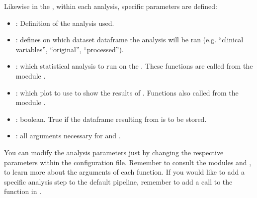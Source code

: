 \documentclass[letterpaper,10pt,english]{sphinxmanual}
\begin{document}
Likewise in the {\hyperref[\detokenize{getting_started/data_settings/clinical-data:clinical-data-conf-file}]{}}, within each analysis, specific parameters are defined:
\begin{itemize}
\item {} 
: Definition of the analysis used.

\item {} 
: defines on which dataset dataframe the analysis will be ran (e.g. “clinical variables”, “original”, “processed”).

\item {} 
: which statistical analysis to run on the . These functions are called from the mocdule .

\item {} 
: which plot to use to show the results of . Functions also called from the mocdule .

\item {} 
: boolean. True if the dataframe resulting from  is to be stored.

\item {} 
: all arguments necessary for  and .

\end{itemize}

You can modify the analysis parameters just by changing the respective parameters within the configuration file. Remember to consult the modules  and , to learn more about the arguments of each function.
If you would like to add a specific analysis step to the default pipeline, remember to add a call to the function in .
\end{document}
